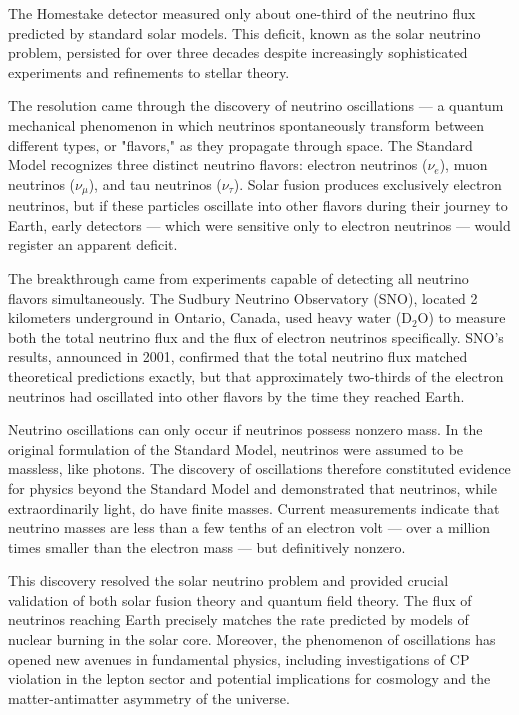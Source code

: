 The Homestake detector measured only about one-third of the neutrino flux predicted by standard solar models. This deficit, known as the solar neutrino problem, persisted for over three decades despite increasingly sophisticated experiments and refinements to stellar theory.

The resolution came through the discovery of neutrino oscillations — a quantum mechanical phenomenon in which neutrinos spontaneously transform between different types, or "flavors," as they propagate through space. The Standard Model recognizes three distinct neutrino flavors: electron neutrinos ($\nu_e$), muon neutrinos ($\nu_\mu$), and tau neutrinos ($\nu_\tau$). Solar fusion produces exclusively electron neutrinos, but if these particles oscillate into other flavors during their journey to Earth, early detectors — which were sensitive only to electron neutrinos — would register an apparent deficit.

The breakthrough came from experiments capable of detecting all neutrino flavors simultaneously. The Sudbury Neutrino Observatory (SNO), located 2 kilometers underground in Ontario, Canada, used heavy water ($\text{D}_2\text{O}$) to measure both the total neutrino flux and the flux of electron neutrinos specifically. SNO's results, announced in 2001, confirmed that the total neutrino flux matched theoretical predictions exactly, but that approximately two-thirds of the electron neutrinos had oscillated into other flavors by the time they reached Earth.

Neutrino oscillations can only occur if neutrinos possess nonzero mass. In the original formulation of the Standard Model, neutrinos were assumed to be massless, like photons. The discovery of oscillations therefore constituted evidence for physics beyond the Standard Model and demonstrated that neutrinos, while extraordinarily light, do have finite masses. Current measurements indicate that neutrino masses are less than a few tenths of an electron volt — over a million times smaller than the electron mass — but definitively nonzero.

This discovery resolved the solar neutrino problem and provided crucial validation of both solar fusion theory and quantum field theory. The flux of neutrinos reaching Earth precisely matches the rate predicted by models of nuclear burning in the solar core. Moreover, the phenomenon of oscillations has opened new avenues in fundamental physics, including investigations of CP violation in the lepton sector and potential implications for cosmology and the matter-antimatter asymmetry of the universe.

